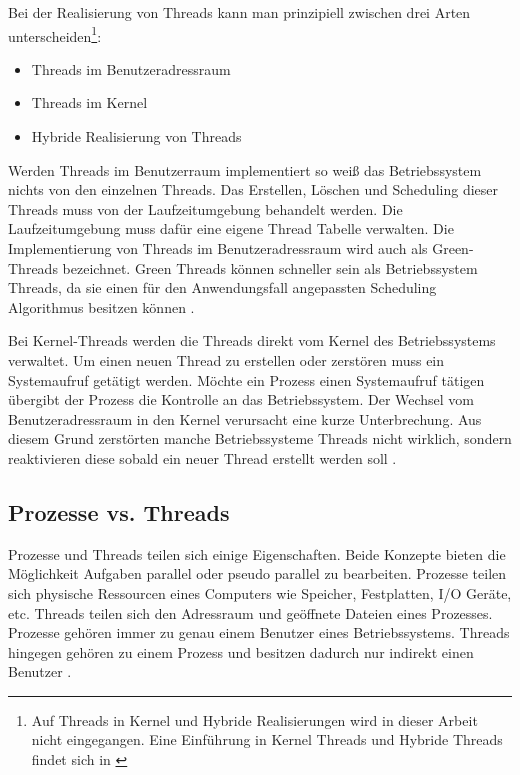 Bei der Realisierung von Threads kann man prinzipiell zwischen drei Arten unterscheiden\footnote{Auf Threads in Kernel und Hybride Realisierungen wird in dieser Arbeit nicht eingegangen. Eine Einführung in Kernel Threads und Hybride Threads findet sich in \cite[p. 109-110]{tan09}}:

\begin{itemize}
  \item Threads im Benutzeradressraum
  \item Threads im Kernel 
  \item Hybride Realisierung von Threads
\end{itemize}

Werden Threads im Benutzerraum implementiert so weiß das Betriebssystem nichts von den einzelnen Threads. Das Erstellen, Löschen und Scheduling dieser Threads muss von der Laufzeitumgebung  behandelt werden. Die Laufzeitumgebung muss dafür eine eigene Thread Tabelle verwalten. Die Implementierung von Threads im Benutzeradressraum wird auch als Green-Threads bezeichnet. Green Threads können schneller sein als Betriebssystem Threads, da sie einen für den Anwendungsfall angepassten Scheduling Algorithmus besitzen können \cite[p. 106-108]{tan09}.

Bei Kernel-Threads werden die Threads direkt vom Kernel des Betriebssystems verwaltet. Um einen neuen Thread zu erstellen oder zerstören muss ein Systemaufruf getätigt werden. Möchte ein Prozess einen Systemaufruf tätigen übergibt der Prozess die Kontrolle an das Betriebssystem. Der Wechsel vom Benutzeradressraum in den Kernel verursacht eine kurze Unterbrechung. Aus diesem Grund zerstörten manche Betriebssysteme Threads nicht wirklich, sondern reaktivieren diese sobald ein neuer Thread erstellt werden soll \cite[p. 59, p. 106-108]{tan09}.


\subsection{Prozesse vs. Threads}

Prozesse und Threads teilen sich einige Eigenschaften. Beide Konzepte bieten die Möglichkeit Aufgaben parallel oder pseudo parallel zu bearbeiten. Prozesse teilen sich physische Ressourcen eines Computers wie Speicher, Festplatten, I/O Geräte, etc. Threads teilen sich den Adressraum und geöffnete Dateien eines Prozesses. Prozesse gehören immer zu genau einem Benutzer eines Betriebssystems. Threads hingegen gehören zu einem Prozess und besitzen dadurch nur indirekt einen Benutzer \cite[p. 89]{tan09}. 


